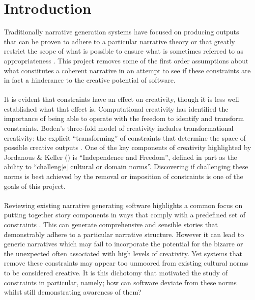 \documentclass[letterpaper]{article}
\begin{document}
\section{Introduction}
Traditionally narrative generation systems have focused on producing outputs that can be proven to adhere to a particular narrative theory \cite{PickeringJordanous} or that greatly restrict the scope of what is possible \cite{leon2008creative} to ensure what is sometimes referred to as appropriateness \cite{Sharples96anaccount}. This project removes some of the first order assumptions about what constitutes a coherent narrative in an attempt to see if these constraints are in fact a hinderance to the creative potential of software.\\ 
\\It is evident that constraints have an effect on creativity, though it is less well established what that effect is. Computational creativity has identified the importance of being able to operate with the freedom to identify and transform constraints. Boden's three-fold model of creativity includes transformational creativity: the explicit \enquote{transforming} of constraints that determine the space of possible creative outputs \cite{boden2004creative}. One of the key components of creativity highlighted by Jordanous \& Keller (\citeyear{JordanousKeller}) is \enquote{Independence and Freedom}, defined in part as the ability to \enquote{challeng[e] cultural or domain norms}. Discovering if challenging these norms is best achieved by the removal or imposition of constraints is one of the goals of this project.\\
\\Reviewing existing narrative generating software highlights a common focus on putting together story components in ways that comply with a predefined set of constraints \cite{Perez2015,laclaustra2014}. This can generate comprehensive and sensible stories that demonstrably adhere to a particular narrative structure. However it can lead to generic narratives which may fail to incorporate the potential for the bizarre or the unexpected often associated with high levels of creativity. Yet systems that remove these constraints may appear too unmoored from existing cultural norms to be considered creative. It is this dichotomy that motivated the study of constraints in particular, namely; how can software deviate from these norms whilst still demonstrating awareness of them?\\
\end{document}
